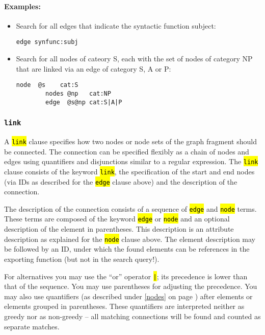 \documentclass[12pt]{scrartcl}
\newcommand{\code}[1]{\hl{\texttt{#1}}}
\begin{document}
\paragraph*{Examples:}
\begin{itemize}
	\item Search for all edges that indicate the syntactic function subject:
	\begin{lstlisting}[gobble=8,aboveskip=.6em,belowskip=.2em]
		edge synfunc:subj
	\end{lstlisting}
	\item Search for all nodes of cateory S, each with the set of nodes of category NP that are linked via an edge of category S, A or P:
	\begin{lstlisting}[gobble=8,aboveskip=.6em,belowskip=.2em]
		node  @s    cat:S
		nodes @np   cat:NP
		edge  @s@np cat:S|A|P
	\end{lstlisting}
\end{itemize}



\subsubsection{\texttt{link}}\label{link}

A \code{link} clause specifies how two nodes or node sets of the graph fragment should be connected.
The connection can be specified flexibly as a chain of nodes and edges using quantifiers and disjunctions similar to a regular expression.
The \code{link} clause consists of the keyword \code{link}, the specification of the start and end nodes (via IDs as described for the \code{edge} clause above) and the description of the connection.

The description of the connection consists of a sequence of \code{edge} and \code{node} terms.
These terms are composed of the keyword \code{edge} or \code{node} and an optional description of the element in parentheses.
This description is an attribute description as explained for the \code{node} clause above.
The element description may be followed by an ID, under which the found elements can be references in the exporting function (but not in the search query!).

For alternatives you may use the “or” operator \code{|}; its precedence is lower than that of the sequence.
You may use parentheses for adjusting the precedence.
You may also use quantifiers (as described under \ref{nodes} on page \pageref{quantifiers}) after elements or elements grouped in parentheses.
These quantifiers are interpreted neither as greedy nor as non-greedy – all matching connections will be found and counted as separate matches.
\end{document}
